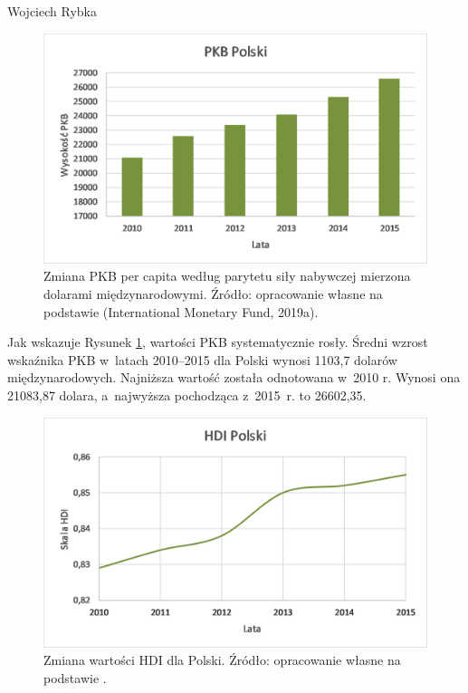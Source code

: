 \begin{artplenv}{Wojciech Rybka}
\begin{figure}[h]
	\centering
	\includegraphics[width=1\textwidth]{ART_Rybka/pkb_polski.png} 
	\caption{Zmiana PKB per capita według parytetu siły nabywczej mierzona dolarami międzynarodowymi.
		Źródło: opracowanie własne na podstawie
		\parencite{international_monetary_fund_world_2019a}
		\label{ref:RNDl3ypL6FseV}(International Monetary Fund, 2019a).
	}
	\label{fig1:ryb}
\end{figure}


%
%
%

Jak wskazuje Rysunek \ref{fig1:ryb}, wartości PKB systematycznie rosły. Średni wzrost wskaźnika PKB w~latach 2010–2015 dla Polski
wynosi 1103,7 dolarów międzynarodowych. Najniższa wartość została odnotowana w~2010 r. Wynosi ona 21083,87 dolara,
a~najwyższa pochodząca z~2015~r. to 26602,35. 

\begin{figure}[H]
	\centering
	\includegraphics[width=1\textwidth]{ART_Rybka/hdi_polski.png} 
	\caption{Zmiana wartości HDI dla Polski.
		Źródło: opracowanie własne na podstawie
		\parencite{united_nations_development_programme_human_2019}.
	}
	\label{fig2:ryb}
\end{figure}



\end{artplenv}
